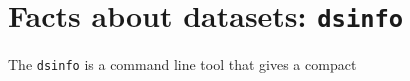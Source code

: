 \section{Facts about datasets: \texttt{dsinfo}}

The \texttt{dsinfo} is a command line tool that gives a compact 